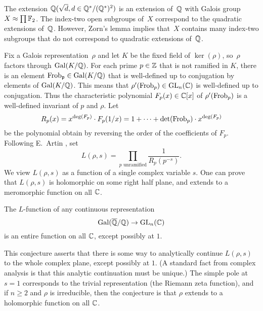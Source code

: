 {\begin{exercise}
	\begin{hint}
		The extension $\mathbb{Q}(\sqrt{d}, d \in \mathbb{Q}^*/(\mathbb{Q}^*)^2)$
		is an extension of~$\mathbb{Q}$ with Galois group $X\approx \prod \mathbb{F}_2$.
		The index-two open subgroups of~$X$ correspond to the quadratic
		extensions of~$\mathbb{Q}$. However, Zorn's lemma implies that~$X$
		contains many index-two subgroups that do not correspond to
		quadratic extensions of~$\mathbb{Q}$.
	\end{hint}
\end{exercise}

Fix a Galois representation~$\rho$ and let $K$ be the fixed field of
$\ker(\rho)$, so~$\rho$ factors through $\operatorname{Gal}(K/\mathbb{Q})$.  For each prime
$p\in\mathbb{Z}$ that is not ramified in $K$, there is an element
$\operatorname{Frob}_{\mathfrak{p}}\in\operatorname{Gal}(K/\mathbb{Q})$ that is well-defined up to conjugation by
elements of $\operatorname{Gal}(K/\mathbb{Q})$.  This means that $\rho'(\operatorname{Frob}_p)\in
\operatorname{GL}_n(\mathbb{C})$ is well-defined up to conjugation.  Thus the characteristic
polynomial $F_p(x)\in\mathbb{C}[x]$ of $\rho'(\operatorname{Frob}_p)$ is a well-defined
invariant of $p$ and $\rho$.  Let
$$R_p(x) = x^{\deg(F_p)}\cdot F_p(1/x) = 1 + \cdots +
\det(\operatorname{Frob}_p)\cdot x^{\deg(F_p)}$$
be the polynomial obtain
by reversing the order of the coefficients of $F_p$.
Following E.~Artin \cite{artin:conjecture, artin:conjecture2}, set
\begin{equation}\label{eqn:artin}
L(\rho,s) = \prod_{p\text{ unramified}}
\frac{1}{R_p(p^{-s})}.
\end{equation}
We view $L(\rho,s)$ as a function of a single complex variable $s$.
One can prove that $L(\rho,s)$ is holomorphic on some right
half plane, and extends to a meromorphic function on all $\mathbb{C}$.
\begin{conjecture}[Artin]\label{conj:artin}
The $L$-function of any continuous representation $$\operatorname{Gal}(\overline{\mathbb{Q}}/\mathbb{Q})\to\operatorname{GL}_n(\mathbb{C})$$
is an entire function on all $\mathbb{C}$, except possibly at $1$.
\end{conjecture}
This conjecture asserts that there is some way to analytically continue
$L(\rho,s)$ to the whole complex plane, except possibly at $1$.
(A standard fact from complex analysis is that this analytic
continuation must be unique.)
The simple pole at $s=1$ corresponds to the trivial representation (the
Riemann zeta function), and if $n\geq 2$ and $\rho$ is irreducible,
then the conjecture is that $\rho$ extends to a holomorphic function
on all $\mathbb{C}$.

}
